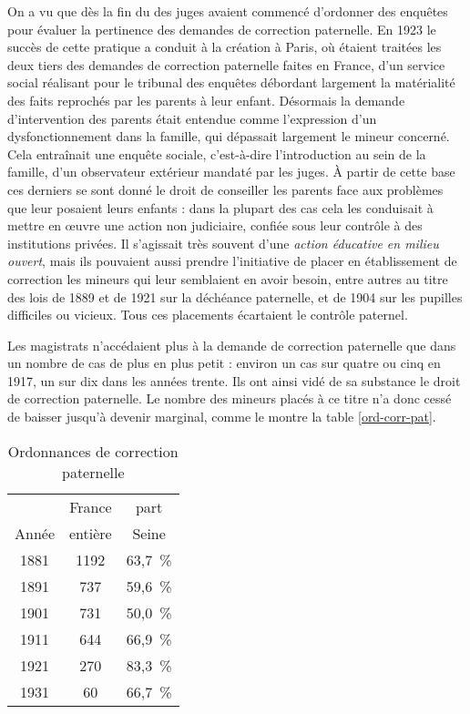  On a vu que dès la fin du  des juges avaient commencé d'ordonner des enquêtes pour évaluer la pertinence des demandes de correction paternelle. En 1923 le succès de cette pratique a conduit à la création à Paris, où étaient traitées les deux tiers des demandes de correction paternelle faites en France, d'un service social réalisant pour le tribunal des enquêtes débordant largement la matérialité des faits reprochés par les parents à leur enfant. Désormais la demande d'intervention des parents était entendue comme l'expression d'un dysfonctionnement dans la famille, qui dépassait largement le mineur concerné. Cela entraînait une enquête sociale, c'est-à-dire l'introduction au sein de la famille, d'un observateur extérieur mandaté par les juges. À partir de cette base ces derniers se sont donné le droit de conseiller les parents face aux problèmes que leur posaient leurs enfants : dans la plupart des cas cela les conduisait à mettre en œuvre une action non judiciaire, confiée sous leur contrôle à des institutions privées. Il s'agissait très souvent d'une \emph{action éducative en milieu ouvert}, mais ils pouvaient aussi prendre l'initiative de placer en établissement de correction les mineurs qui leur semblaient en avoir besoin, entre autres au titre des lois de 1889 et de 1921 sur la déchéance paternelle, et de 1904 sur les pupilles difficiles ou vicieux. Tous ces placements écartaient le contrôle paternel.

 Les magistrats n'accédaient plus à la demande de correction paternelle que dans un nombre de cas de plus en plus petit : environ un cas sur quatre ou cinq en 1917, un sur dix dans les années trente. Ils ont ainsi vidé de sa substance le droit de correction paternelle. Le nombre des mineurs placés à ce titre n'a donc cessé de baisser jusqu'à devenir marginal, comme le montre la table \vref{ord-corr-pat}.
 
\begin{table}[h]
\centering
\caption{Ordonnances de correction paternelle}
\label{ord-corr-pat}
\begin{tabular}{ccc}
 & France & part \\
Année & entière & Seine \\
\hline
1881 & 1192 & 63,7~\% \\
1891 & 737 & 59,6~\% \\
1901 & 731 & 50,0~\% \\
1911 & 644 & 66,9~\% \\
1921 & 270 & 83,3~\% \\
1931 & 60 & 66,7~\%
\end{tabular}
\end{table}
 
